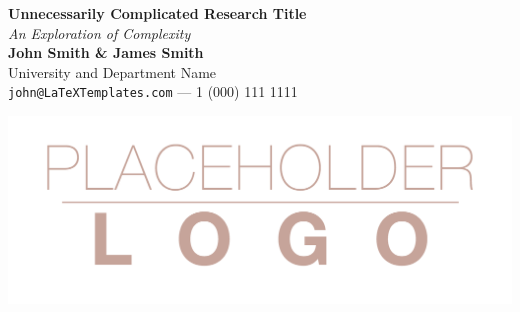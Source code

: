 \documentclass[a0,portrait]{a0poster}
\begin{document}


\begin{minipage}[b]{0.75\linewidth}
\veryHuge \color{NavyBlue} \textbf{Unnecessarily Complicated Research Title} \color{Black}\\ %
\Huge\textit{An Exploration of Complexity}\\[2cm] %
\huge \textbf{John Smith \& James Smith}\\[0.5cm] %
\huge University and Department Name\\[0.4cm] %
\Large \texttt{john@LaTeXTemplates.com} --- 1 (000) 111 1111\\
\end{minipage}
%
\begin{minipage}[b]{0.25\linewidth}
\includegraphics[width=20cm]{logo.png}\\
\end{minipage}

\vspace{1cm} %

\end{document}

